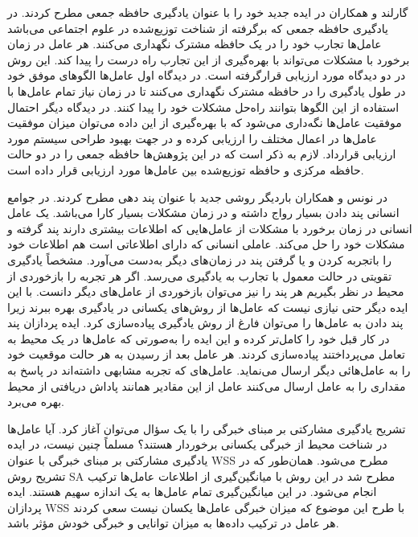 گارلند و همکاران در  ایده جدید خود را با عنوان یادگیری حافظه جمعی مطرح کردند. در یادگیری حافظه جمعی که برگرفته از شناخت توزیع‌شده در علوم اجتماعی می‌باشد عامل‌ها تجارب خود را در یک حافظه مشترک نگهداری می‌کنند. هر عامل در زمان برخورد با مشکلات می‌تواند با بهره‌گیری از این تجارب راه درست را پیدا کند.
این روش در دو دیدگاه مورد ارزیابی قرارگرفته است. در دیدگاه اول عامل‌ها الگوهای موفق خود در طول یادگیری را در حافظه مشترک نگهداری می‌کنند تا در زمان نیاز تمام عامل‌ها با استفاده از این الگوها بتوانند راه‌حل مشکلات خود را پیدا کنند. در دیدگاه دیگر احتمال موفقیت عامل‌ها نگه‌داری می‌شود که با بهره‌گیری از این داده می‌توان میزان موفقیت عامل‌ها در اعمال مختلف را ارزیابی کرده و در جهت بهبود طراحی سیستم مورد ارزیابی قرارداد. لازم به ذکر است که در این پژوهش‌ها حافظه جمعی را در دو حالت حافظه مرکزی و حافظه توزیع‌شده بین عامل‌ها مورد ارزیابی قرار داده است.

در  نونس و همکاران باردیگر روشی جدید با عنوان پند دهی مطرح کردند. در جوامع انسانی پند دادن بسیار رواج داشته و در زمان مشکلات بسیار کارا می‌باشد. یک عامل انسانی در زمان برخورد با مشکلات از عامل‌هایی که اطلاعات بیشتری دارند پند گرفته و مشکلات خود را حل می‌کند. عاملی انسانی که دارای اطلاعاتی است هم اطلاعات خود را باتجربه کردن و یا گرفتن پند در زمان‌های دیگر به‌دست می‌آورد. مشخصاً یادگیری تقویتی در حالت معمول با تجارب به یادگیری می‌رسد. اگر هر تجربه را بازخوردی از محیط در نظر بگیریم هر پند را نیز می‌توان بازخوردی از عامل‌های دیگر دانست. با این ایده دیگر حتی نیازی نیست که عامل‌ها از روش‌های یکسانی در یادگیری بهره ببرند زیرا پند دادن به عامل‌ها را می‌توان فارغ از روش یادگیری پیاده‌سازی کرد.
ایده پردازان پند در کار قبل خود را کامل‌تر کرده و این ایده را به‌صورتی که عامل‌ها در یک محیط به تعامل می‌پرداختند پیاده‌سازی کردند. هر عامل بعد از رسیدن به هر حالت موقعیت خود را به عامل‌هائی دیگر ارسال می‌نماید. عامل‌های که تجربه مشابهی داشته‌اند در پاسخ به مقداری را به عامل ارسال می‌کنند عامل از این مقادیر همانند پاداش دریافتی از محیط بهره می‌برد.

تشریح یادگیری مشارکتی بر مبنای خبرگی را با یک سؤال می‌توان آغاز کرد. آیا عامل‌ها در شناخت محیط از خبرگی یکسانی برخوردار هستند؟ مسلماً چنین نیست، در ایده یادگیری مشارکتی بر مبنای خبرگی با عنوان WSS مطرح می‌شود.
همان‌طور که در تشریح روش SA مطرح شد در این روش با میانگین‌گیری از اطلاعات عامل‌ها ترکیب انجام می‌شود. در این میانگین‌گیری تمام عامل‌ها به یک اندازه سهیم هستند. ایده پردازان WSS با طرح این موضوع که میزان خبرگی عامل‌ها یکسان نیست سعی کردند هر عامل در ترکیب داده‌ها به میزان توانایی و خبرگی خودش مؤثر باشد.

